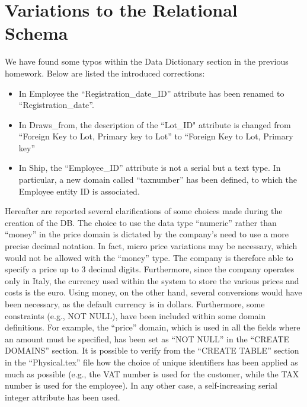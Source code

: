 \section{Variations to the Relational Schema}

We have found some typos within the Data Dictionary section in the previous homework. Below are listed the introduced corrections:
\begin{itemize}
	\item In Employee the ``Registration\_date\_ID'' attribute has been renamed to ``Registration\_date''.
	\item In Draws\_from, the description of the ``Lot\_ID" attribute is changed from ``Foreign Key to Lot, Primary key to Lot'' to ``Foreign Key to Lot, Primary key''
	\item In Ship, the ``Employee\_ID'' attribute is not a serial but a text type. In particular, a new domain called ``taxnumber'' has been defined, to which the Employee entity ID is associated.
\end{itemize}

\noindent Hereafter are reported several clarifications of some choices made during the creation of the DB. The choice to use the data type ``numeric'' rather than ``money'' in the price domain is dictated by the company's need to use a more precise decimal notation. In fact, micro price variations may be necessary, which would not be allowed with the ``money'' type. The company is therefore able to specify a price up to 3 decimal digits. Furthermore, since the company operates only in Italy, the currency used within the system to store the various prices and costs is the euro. Using money, on the other hand, several conversions would have been necessary, as the default currency is in dollars. Furthermore, some constraints (e.g., NOT NULL), have been included within some domain definitions. For example, the ``price'' domain, which is used in all the fields where an amount must be specified, has been set as ``NOT NULL'' in the ``CREATE DOMAINS'' section. It is possible to verify from the ``CREATE TABLE'' section in the ``Physical.tex'' file how the choice of unique identifiers has been applied as much as possible (e.g., the VAT number is used for the customer, while the TAX number is used for the employee). In any other case, a self-increasing serial integer attribute has been used.